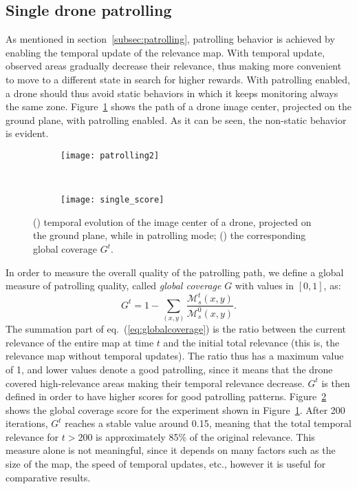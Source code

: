 \documentclass{article}
\begin{document}
\subsection{Single drone patrolling}
As mentioned in section~\ref{subsec:patrolling}, patrolling behavior is achieved by enabling the temporal update of the relevance map. With temporal update, observed areas gradually decrease their relevance, thus making more convenient to move to a different state in search for higher rewards. With patrolling enabled, a drone should thus avoid static behaviors in which it keeps monitoring always the same zone. Figure~\ref{fig:patrolling:1} shows the path of a drone image center, projected on the ground plane, with patrolling enabled. As it can be seen, the non-static behavior is evident. 
\begin{figure}
	\centering
	\begin{subfigure}[t]{0.5\textwidth}
		\centering
		\texttt{[image: patrolling2]}
		\caption{\label{fig:patrolling:1}}
	\end{subfigure}\\
	\begin{subfigure}[t]{0.5\textwidth}
		\centering
		\texttt{[image: single\_score]}
		\caption{\label{fig:patrolling:2}}
	\end{subfigure}%
	\caption{() temporal evolution of the image center of a drone, projected on the ground plane, while in patrolling mode; () the corresponding global coverage $G^t$.}
	\label{fig:patrolling}
\end{figure}

In order to measure the overall quality of the patrolling path, we define a global measure of patrolling quality, called \emph{global coverage} $G$ with values in $[0,1]$, as:
\begin{equation}
	G^t = 1 - \sum_{(x,y)} \frac{ \mathcal{M}^t_s(x,y) }{ \mathcal{M}^0_s(x,y) }
	\label{eq:globalcoverage}.
\end{equation}
The summation part of eq.~(\ref{eq:globalcoverage}) is the ratio between the current relevance of the entire map at time $t$ and the initial total relevance (this is, the relevance map without temporal updates). The ratio thus has a maximum value of 1, and lower values denote a good patrolling, since it means that the drone covered high-relevance areas making their temporal relevance decrease. $G^t$ is then defined in order to have higher scores for good patrolling patterns. Figure~\ref{fig:patrolling:2} shows the global coverage score for the experiment shown in Figure~\ref{fig:patrolling:1}. After 200 iterations, $G^t$ reaches a stable value around 0.15, meaning that the total temporal relevance for $t>200$ is approximately 85\% of the original relevance. This measure alone is not meaningful, since it depends on many factors such as the size of the map, the speed of temporal updates, etc., however it is useful for comparative results.
\end{document}
